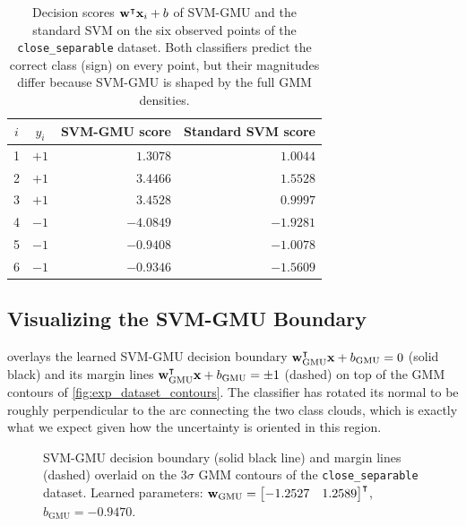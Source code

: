\documentclass[11pt, letterpaper]{article}
\begin{document}
\begin{table}[H]
    \centering
    \caption{Decision scores $\vb{w}^{\intercal}\vb{x}_i + b$ of SVM-GMU and the standard SVM on the six observed points of the \texttt{close\_separable} dataset. Both classifiers predict the correct class (sign) on every point, but their magnitudes differ because SVM-GMU is shaped by the full GMM densities.}
    \label{tab:exp_decision_scores}
    \begin{tabular}{@{}ccrr@{}}
        \toprule
        $i$ & $y_i$ & SVM-GMU score & Standard SVM score \\
        \midrule
        1 & $+1$ & $ 1.3078$ & $ 1.0044$ \\
        2 & $+1$ & $ 3.4466$ & $ 1.5528$ \\
        3 & $+1$ & $ 3.4528$ & $ 0.9997$ \\
        4 & $-1$ & $-4.0849$ & $-1.9281$ \\
        5 & $-1$ & $-0.9408$ & $-1.0078$ \\
        6 & $-1$ & $-0.9346$ & $-1.5609$ \\
        \bottomrule
    \end{tabular}
\end{table}

\subsection{Visualizing the SVM-GMU Boundary}

 overlays the learned SVM-GMU decision boundary $\vb{w}_{\text{GMU}}^{\intercal}\vb{x} + b_{\text{GMU}} = 0$ (solid black) and its margin lines $\vb{w}_{\text{GMU}}^{\intercal}\vb{x} + b_{\text{GMU}} = \pm 1$ (dashed) on top of the GMM contours of \cref{fig:exp_dataset_contours}. The classifier has rotated its normal to be roughly perpendicular to the arc connecting the two class clouds, which is exactly what we expect given how the uncertainty is oriented in this region.

\begin{figure}[H]
    \centering
    \resizebox{0.75\textwidth}{!}{}
    \caption{SVM-GMU decision boundary (solid black line) and margin lines (dashed) overlaid on the $3\sigma$ GMM contours of the \texttt{close\_separable} dataset. Learned parameters: $\vb{w}_{\text{GMU}} = \begin{bmatrix}-1.2527 & 1.2589\end{bmatrix}^{\intercal}$, $b_{\text{GMU}} = -0.9470$.}
    \label{fig:exp_boundary_gmu}
\end{figure}
\end{document}
